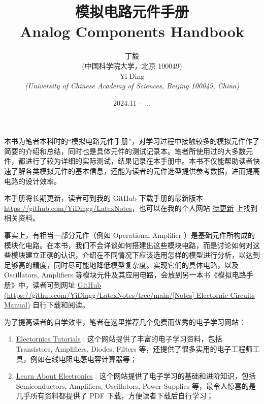 \documentclass[UTF8]{report}
\title{模拟电路元件手册\\ Analog Components Handbook}
\author{丁毅\\ \footnotesize {\kaishu (中国科学院大学，北京 100049)} \\ Yi Ding \\ \footnotesize \textit{(University of Chinese Academy of Sciences, Beijing 100049, China)}}
\date{\footnotesize 2024.11 -- ...}
\begin{document}
 

    \maketitle\newpage  
    \thispagestyle{fancy}   %

\begin{cnabstract}\normalsize 
本书为笔者本科时的“模拟电路元件手册”，对学习过程中接触较多的模拟元件作了简要的介绍和总结，同时也是具体元件的测试记录本。笔者所使用过的大多数元件，都进行了较为详细的实际测试，结果记录在本手册中。本书不仅能帮助读者快速了解各类模拟元件的基本信息，还能为读者的元件选型提供参考数据，进而提高电路的设计效率。

本手册将长期更新，读者可到我的 GitHub 下载手册的最新版本 \href{https://github.com/YiDingg/LatexNotes}{https://github.com/YiDingg/LatexNotes}，也可以在我的个人网站 \href{URL}{待更新} 上找到相关资料。

事实上，有相当一部分元件（例如 Operational Amplifier ）是基础元件所构成的模块化电路。在本书，我们不会详谈如何搭建出这些模块电路，而是讨论如何对这些模块建立正确的认识，介绍在不同情况下应该选用怎样的模型进行分析，以达到足够高的精度，同时尽可能地降低模型复杂度。实现它们的具体电路，以及 Oscillators, Amplifiers 等模块元件及其应用电路，会放到另一本书{\kaishu 《模拟电路手册》}中，读者可到网址 \href{https://github.com/YiDingg/LatexNotes/tree/main/%5BNotes%5D%20Electornic%20Circuits%20Manual}{GitHub {\color{black} (https://github.com/YiDingg/LatexNotes/tree/main/[Notes] Electornic Circuits Manual)}} 自行下载和阅读。


为了提高读者的自学效率，笔者在这里推荐几个免费而优秀的电子学习网站：
\begin{enumerate}
\item \href{https://www.electronics-tutorials.ws/}{Electornics Tutorials} : 这个网站提供了丰富的电子学习资料，包括 Transistors, Amplifiers, Diodes, Filters 等，还提供了很多实用的电子工程师工具，例如在线电阻电感电容计算器等；

\item \href{https://www.learnabout-electronics.org/}{Learn About Electronics} : 这个网站提供了电子学习的基础和进阶知识，包括 Semiconductors, Amplifiers, Oscillators, Power Supplies 等，最令人惊喜的是几乎所有资料都提供了 PDF 下载，方便读者下载后自行学习；


\end{enumerate}
\end{cnabstract}
\end{document}
